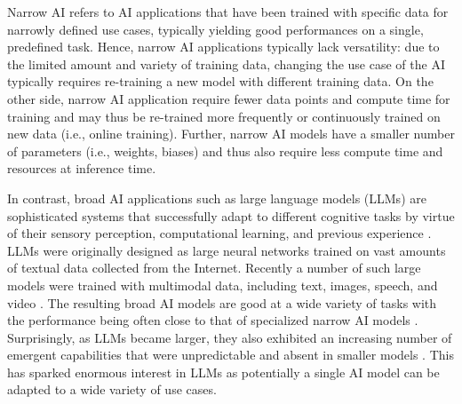 Narrow AI refers to AI applications that have been trained with specific data for narrowly defined use
cases, typically yielding good performances on a single, predefined task. Hence, narrow AI applications typically lack
versatility: due to the limited amount and variety of training data, changing the use case of the AI typically
requires re-training a new model with different training data. On the other side, narrow AI application require fewer
data points and compute time for training and may thus be re-trained more frequently or continuously trained on new data
(i.e., online training). Further, narrow AI models have a smaller number of parameters (i.e., weights, biases) and
thus also require less compute time and resources at inference time.

In contrast, broad AI applications such as large language models (LLMs) are sophisticated systems that successfully
adapt to different cognitive tasks by virtue of their sensory perception, computational learning, and
previous experience \citep{hochreiterBroadAI2022}. LLMs were originally designed as large neural networks trained
on vast amounts of textual data collected from the Internet. Recently a number of such large models were trained
with multimodal data, including text, images, speech, and video \citep{bommasaniOpportunitiesRisksFoundation2022}.
The resulting broad AI models are good at a wide variety of tasks with the performance being often close to that of
specialized narrow AI models \citep{bommasaniOpportunitiesRisksFoundation2022}. Surprisingly, as LLMs became larger,
they also exhibited an increasing number of emergent capabilities that were unpredictable and absent in smaller models
\citep{weiEmergentAbilitiesLarge2022}. This has sparked enormous interest in LLMs as potentially a single AI model 
can be adapted to a wide variety of use cases. 

